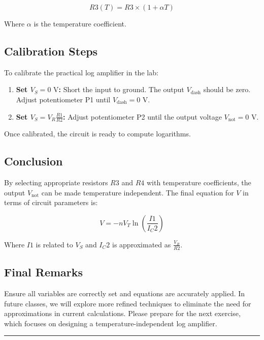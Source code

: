 \documentclass[a4paper,9pt,twoside,openany,twocolumn]{memoir}
\begin{document}
\[
R3(T) = R3 \times (1 + \alpha T)
\]

Where \( \alpha \) is the temperature coefficient.

\subsection{Calibration Steps}

To calibrate the practical log amplifier in the lab:

\begin{enumerate}
    \item \textbf{Set \( V_S = 0 \text{ V} \):} Short the input to ground. The output \( V_{\text{dash}} \) should be zero. Adjust potentiometer P1 until \( V_{\text{dash}} = 0 \text{ V} \).
    \item \textbf{Set \( V_S = V_R \frac{R1}{R2} \):} Adjust potentiometer P2 until the output voltage \( V_{\text{not}} = 0 \text{ V} \).
\end{enumerate}

Once calibrated, the circuit is ready to compute logarithms.

\subsection{Conclusion}

By selecting appropriate resistors \( R3 \) and \( R4 \) with temperature coefficients, the output \( V_{\text{not}} \) can be made temperature independent. The final equation for \( V \) in terms of circuit parameters is:

\[
V = -n V_T \ln\left(\frac{I1}{I_C2}\right)
\]

Where \( I1 \) is related to \( V_S \) and \( I_C2 \) is approximated as \( \frac{V_R}{R2} \).

\subsection{Final Remarks}

Ensure all variables are correctly set and equations are accurately applied. In future classes, we will explore more refined techniques to eliminate the need for approximations in current calculations. Please prepare for the next exercise, which focuses on designing a temperature-independent log amplifier.

\begin{center}\rule{0.5\linewidth}{0.5pt}\end{center}
\end{document}

